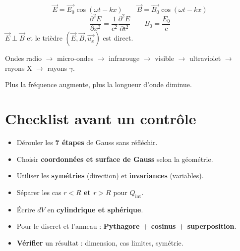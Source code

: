 \documentclass[11pt,a4paper]{article}
\newcommand{\vect}[1]{\overrightarrow{#1}}
\newcommand{\ux}{\vect{u_x}}
\newcommand{\E}{\vect{E}}
\newcommand{\Qint}{Q_{\mathrm{int}}}
\begin{document}
\begin{formule}
\[
\E=\vect{E_0}\cos(\omega t-kx)
\qquad
\vect{B}=\vect{B_0}\cos(\omega t-kx)
\]
\[
\frac{\partial^2E}{\partial x^2}=\frac{1}{c^2}\frac{\partial^2E}{\partial t^2}
\qquad
B_0=\frac{E_0}{c}
\]
$\E\perp\vect{B}$ et le trièdre $(\E,\vect{B},\ux)$ est direct.
\end{formule}

\begin{idee}
Ondes radio $\to$ micro-ondes $\to$ infrarouge $\to$ visible $\to$ ultraviolet $\to$ rayons X $\to$ rayons $\gamma$.

\medskip
Plus la fréquence augmente, plus la longueur d'onde diminue.
\end{idee}

\section{Checklist avant un contrôle}

\begin{methode}
\begin{itemize}[leftmargin=1.5em, itemsep=8pt]
  \item[$\square$] Dérouler les \textbf{7 étapes} de Gauss sans réfléchir.
  \item[$\square$] Choisir \textbf{coordonnées et surface de Gauss} selon la géométrie.
  \item[$\square$] Utiliser les \textbf{symétries} (direction) et \textbf{invariances} (variables).
  \item[$\square$] Séparer les cas \textbf{$r<R$ et $r>R$} pour $\Qint$.
  \item[$\square$] Écrire $dV$ en \textbf{cylindrique et sphérique}.
  \item[$\square$] Pour le discret et l'anneau : \textbf{Pythagore + cosinus + superposition}.
  \item[$\square$] \textbf{Vérifier} un résultat : dimension, cas limites, symétrie.
\end{itemize}
\end{methode}
\end{document}
